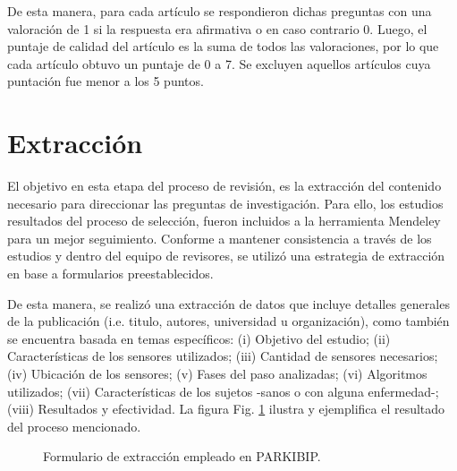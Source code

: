 De esta manera, para cada artículo se respondieron dichas preguntas con una valoración de 1 si la respuesta era afirmativa o en caso contrario 0. Luego, el puntaje de calidad del artículo es la suma de todos las valoraciones, por lo que cada artículo obtuvo un puntaje de 0 a 7. Se excluyen aquellos artículos cuya puntación fue menor a los 5 puntos.

\section{Extracción}

El objetivo en esta etapa del proceso de revisión, es la extracción del contenido necesario para direccionar las preguntas de investigación. Para ello, los estudios resultados del proceso de selección, fueron incluidos a la herramienta Mendeley para un mejor seguimiento. Conforme a mantener consistencia a través de los estudios y dentro del equipo de revisores, se utilizó una estrategia de extracción en base a formularios preestablecidos.

De esta manera, se realizó una extracción de datos que incluye detalles generales de la publicación (i.e. titulo, autores, universidad u organización), como también se encuentra basada en temas específicos: (i) Objetivo del estudio; (ii) Características de los sensores utilizados; (iii) Cantidad de sensores necesarios; (iv) Ubicación de los sensores; (v) Fases del paso analizadas; (vi) Algoritmos utilizados; (vii) Características de los sujetos -sanos o con alguna enfermedad-; (viii) Resultados y efectividad. La figura Fig. \ref{fig:extraction} ilustra y ejemplifica el resultado del proceso mencionado.

\begin{figure}[H]
\begin{center}
\end{center}
\caption{Formulario de extracción empleado en PARKIBIP. }
\label{fig:extraction}
\end{figure} 

